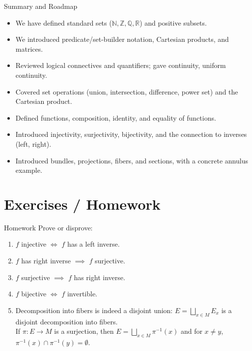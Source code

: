 \documentclass[11pt,aspectratio=43,ignorenonframetext,t]{beamer}
\newcounter{example_number} %
\begin{document}
\begin{frame}{Summary and Roadmap}
\begin{itemize}
  \item We have defined standard sets (\(\mathbb{N},\mathbb{Z},\mathbb{Q},\mathbb{R}\)) and positive subsets.
  \item We introduced predicate/set-builder notation, Cartesian products, and matrices.
  \item Reviewed logical connectives and quantifiers; gave continuity, uniform continuity.
  \item Covered set operations (union, intersection, difference, power set) and the Cartesian product.
  \item Defined functions, composition, identity, and equality of functions.
  \item Introduced injectivity, surjectivity, bijectivity, and the connection to inverses (left, right).
  \item Introduced bundles, projections, fibers, and sections, with a concrete annulus example.
\end{itemize}

\end{frame}





\section{Exercises / Homework}

\begin{frame}{Homework}
Prove or disprove:
\begin{enumerate}
    \item $f$ injective $\iff$ $f$ has a left inverse.
    \item $f$ has right inverse $\implies$ $f$ surjective.
    \item $f$ surjective $\implies$ $f$ has right inverse.
    \item $f$ bijective $\iff$ $f$ invertible.
    \item Decomposition into fibers is indeed a disjoint union: $E = \bigsqcup_{x\in M} E_x$ is a disjoint decomposition into fibers.\\
    If \(\pi: E \to M\) is a surjection, then \(E = \bigsqcup_{x\in M} \pi^{-1}(x)\) and for \(x \neq y\), \(\pi^{-1}(x) \cap \pi^{-1}(y) = \emptyset.\)
\end{enumerate}
\end{frame}
\end{document}
